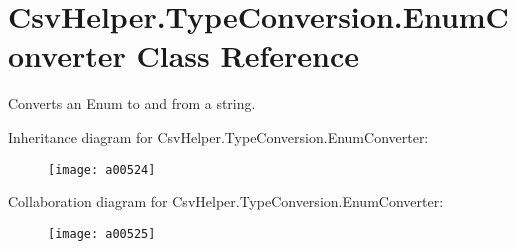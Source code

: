 \hypertarget{a00092}{\section{Csv\-Helper.\-Type\-Conversion.\-Enum\-Converter Class Reference}
\label{a00092}
}


Converts an Enum to and from a string.  




Inheritance diagram for Csv\-Helper.\-Type\-Conversion.\-Enum\-Converter\-:
\nopagebreak
\begin{figure}[H]
\begin{center}
\leavevmode
\texttt{[image: a00524]}
\end{center}
\end{figure}


Collaboration diagram for Csv\-Helper.\-Type\-Conversion.\-Enum\-Converter\-:
\nopagebreak
\begin{figure}[H]
\begin{center}
\leavevmode
\texttt{[image: a00525]}
\end{center}
\end{figure}
